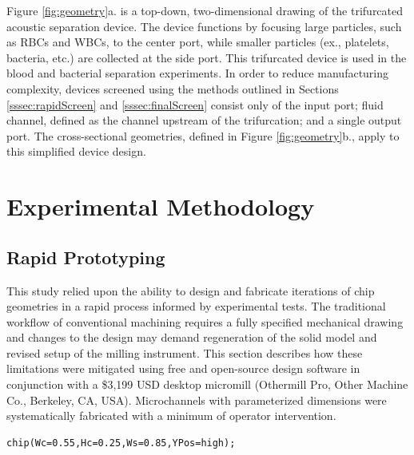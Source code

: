 Figure \ref{fig:geometry}a. is a top-down, two-dimensional drawing of the trifurcated acoustic separation device. The device functions by focusing large particles, such as RBCs and WBCs, to the center port, while smaller particles (ex., platelets, bacteria, etc.) are collected at the side port. This trifurcated device is used in the blood and bacterial separation experiments. In order to reduce manufacturing complexity, devices screened using the methods outlined in Sections \ref{sssec:rapidScreen} and \ref{sssec:finalScreen} consist only of the input port; fluid channel, defined as the channel upstream of the trifurcation; and a single output port. The cross-sectional geometries, defined in Figure \ref{fig:geometry}b., apply to this simplified device design. 

\section{Experimental Methodology}
\label{sec:experiment}

\subsection{Rapid Prototyping}
\label{sec:rp}
This study relied upon the ability to design and fabricate iterations of chip geometries in a rapid process informed by experimental tests. The traditional workflow of conventional machining requires a fully specified mechanical drawing and changes to the design may demand regeneration of the solid model and revised setup of the milling instrument.  This section describes how these limitations were mitigated using free and open-source design software in conjunction with a \$3,199 USD desktop micromill (Othermill Pro, Other Machine Co., Berkeley, CA, USA).  Microchannels with parameterized dimensions were systematically fabricated with a minimum of operator intervention.

\begin{minipage}{0.99\linewidth}
\begin{lstlisting}[caption={The custom OpenSCAD library allows solid model creation using just a single line of code},label={lst:chip}, frame=single, language=scad]
  chip(Wc=0.55,Hc=0.25,Ws=0.85,YPos=high);
\end{lstlisting}
\end{minipage}

